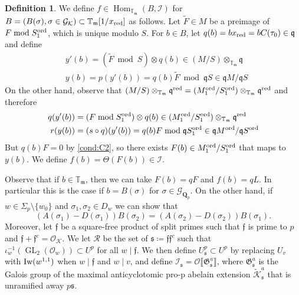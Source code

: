 \documentclass[leqno]{amsart}
\theoremstyle{definition}
\newtheorem{defn}[thm]{Definition}
\theoremstyle{remark}
\newcommand{\oo}{\mathcal{O}}
\newcommand{\Qp}{\mathbf{Q}_p}
\DeclareMathOperator{\Hom}{Hom}
\DeclareMathOperator{\GL}{GL}
\DeclareMathOperator{\Gal}{\mathcal{G}}
\newcommand{\ff}{\mathfrak{f}}
\newcommand{\fm}{\mathfrak{m}}
\newcommand{\fq}{\mathfrak{q}}
\newcommand{\fs}{\mathfrak{s}}
\newcommand{\Gp}{\mathcal{G}_{\Qp}} %
\newcommand{\red}{\textnormal{red}}
\newcommand{\xx}{x_\textnormal{red}}
\newcommand{\K}{{\mathcal{K}}} %
\newcommand{\fG}{\mathfrak{G}}
\newcommand{\Iw}{\textnormal{Iw}} %
\newcommand{\TT}{\mathbb{T}} %
\newcommand{\I}{\mathcal{I}} %
\newcommand{\ord}{\textnormal{ord}} %
\begin{document}
\begin{defn}\label{def:cong_map}
We define $f\in \Hom_{\TT_\fm}(B,\I)$ for
$B=(B(\sigma),\sigma\in\Gal_\K)\subset \TT_\fm[1/\xx]$
as follows.
Let $\tilde{F}\in M$ be a preimage of $F\bmod S^\ord_1$,
which is unique modulo $S$.
For $b\in B$, let $q(b)=b\xx=bC(\tau_0)\in\fq$ and define
\begin{align*}
   &y'(b)=(\tilde{F}\bmod S)\otimes q(b)\in(M/S)\otimes_{\TT_\fm}\fq\\
   &y(b)=p(y'(b))= q(b)\tilde{F}\bmod \fq S\in\fq M/\fq S
\end{align*}
On the other hand, observe that 
$(M/S)\otimes_{\TT_\fm}\fq^\red=
(M^{\ord}_1/S^{\ord}_1)\otimes_{\TT_\fm}\fq^\red$
and therefore
\begin{align*}
   q(y'(b))&=(F\bmod S^{\ord}_1)\otimes q(b)\in 
(M^{\ord}_1/S^{\ord}_1)\otimes_{\TT_\fm}\fq^\red\\
   r(y(b))&=(s\circ q)(y'(b))=
q(b)F\bmod \fq S^{\ord}_1\in\fq M^{\ord}/\fq S^{\ord}
\end{align*}
But $q(b){F}=0$ by \ref{cond:C2},
so there exists $F(b)\in M^{\ord}_1/ S^{\ord}_1$ that maps to $y(b)$.
We define $f(b)=\Theta(F(b))\in \I$.
\end{defn}

Observe that if $b\in\TT_\fm$, then 
we can take $F(b)=q F$ and $f(b)=qL$.
In particular this is the case if $b=B(\sigma)$ for $\sigma\in\Gp$.
On the other hand, if $w\in\Sigma_p\setminus\{w_0\}$ and $\sigma_1,\sigma_2\in D_{w}$ we can show that
\[
(A(\sigma_1)-D(\sigma_1))B(\sigma_2)=
(A(\sigma_2)-D(\sigma_2))B(\sigma_1).
\]
Moreover, let $\ff$ be a square-free product of split primes
such that $\ff$ is prime to $p$ and $\ff+\ff^c=\oo_\K$.
We let $\mathcal{R}$ be the set of $\fs\coloneqq\ff\ff^c$
such that $\iota_w^{-1}(\GL_2(\oo_w))\subset U^p$ for all $w\mid\ff$.
We then define $U^p_\fs\subset U^p$ by replacing $U_v$ with
$\Iw(w^{1,1})$ when $w\mid \ff$ and $w\mid v$,
and define $\I_\fs=\oo\llbracket\fG^a_\fs\rrbracket$, 
where $\fG^a_\fs$ is the Galois group of  the maximal anticyclotomic
pro-p abelain extension $\widetilde{\K}^a_\fs$ that is unramified away $p\fs$.
\end{document}
